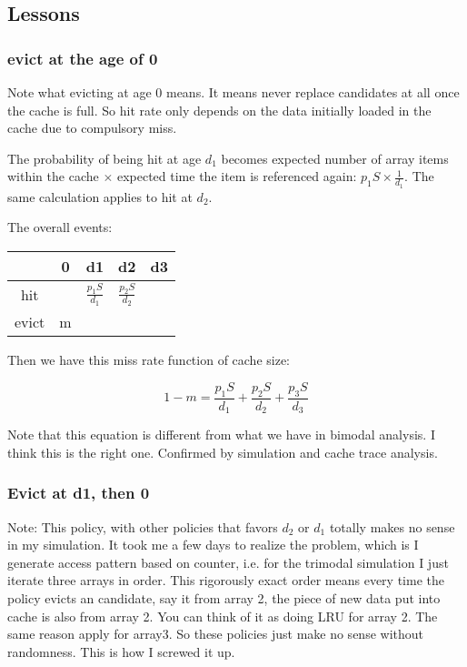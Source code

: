 \subsection{Lessons}

\subsubsection{evict at the age of 0}

Note what evicting at age 0 means. It means never replace candidates at all once
the cache is full. So hit rate only depends on the data initially loaded in the
cache due to compulsory miss. 

The probability of being hit at age $d_1$ becomes expected number of array items
within the cache $\times$ expected time the item is referenced again: $p_1 S
\times \frac{1}{d_1}$. The same calculation applies to hit at $d_2$.

The overall events:

\begin{center}
\begin{tabular}{ c | c c c c }
\hline
 	&	0 & d1  & d2 & d3\\ 
\hline
 hit &	  & $\frac{p_1 S}{d_1}$ & $\frac{p_2 S}{d_2}$  &\\  
 evict &	m &    & &\\
\hline
\end{tabular}
\end{center}

Then we have this miss rate function of cache size:

\begin{equation}
1-m = \frac{p_1 S}{d_1} + \frac{p_2 S}{d_2} + \frac{p_3 S}{d_3}
\end{equation}

Note that this equation is different from what we have in bimodal analysis. I
think this is the right one. Confirmed by simulation and cache trace analysis.

\subsubsection{Evict at d1, then 0}
\label{sec:d1-0}

Note: This policy, with other policies that favors $d_2$ or $d_1$ totally makes
no sense in my simulation. It took me a few days to realize the problem, which
is I generate access pattern based on counter, i.e. for the trimodal simulation
I just iterate three arrays in order. This rigorously exact order means every
time the policy evicts an candidate, say it from array 2, the piece of new data
put into cache is also from array 2. You can think of it as doing LRU for array
2.  The same reason apply for array3. So these policies just make no sense
without randomness. This is how I screwed it up.

